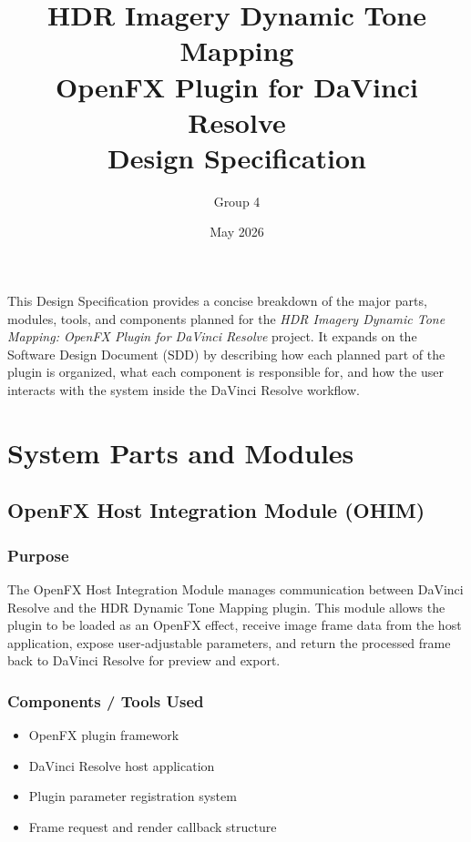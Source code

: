 \documentclass{article}
\title{HDR Imagery Dynamic Tone Mapping \\ OpenFX Plugin for DaVinci Resolve \\ Design Specification}
\author{Group 4}
\date{May 2026}
\begin{document}
\begin{titlepage}
\maketitle
\thispagestyle{empty}
\end{titlepage}

\thispagestyle{empty}
\tableofcontents
\newpage

This Design Specification provides a concise breakdown of the major parts, modules, tools, and components planned for the \textit{HDR Imagery Dynamic Tone Mapping: OpenFX Plugin for DaVinci Resolve} project. It expands on the Software Design Document (SDD) by describing how each planned part of the plugin is organized, what each component is responsible for, and how the user interacts with the system inside the DaVinci Resolve workflow.

\section{System Parts and Modules}

\subsection{OpenFX Host Integration Module (OHIM)}

\subsubsection*{Purpose}
The OpenFX Host Integration Module manages communication between DaVinci Resolve and the HDR Dynamic Tone Mapping plugin. This module allows the plugin to be loaded as an OpenFX effect, receive image frame data from the host application, expose user-adjustable parameters, and return the processed frame back to DaVinci Resolve for preview and export.

\subsubsection*{Components / Tools Used}
\begin{itemize}
    \item OpenFX plugin framework
    \item DaVinci Resolve host application
    \item Plugin parameter registration system
    \item Frame request and render callback structure
\end{itemize}
\end{document}
